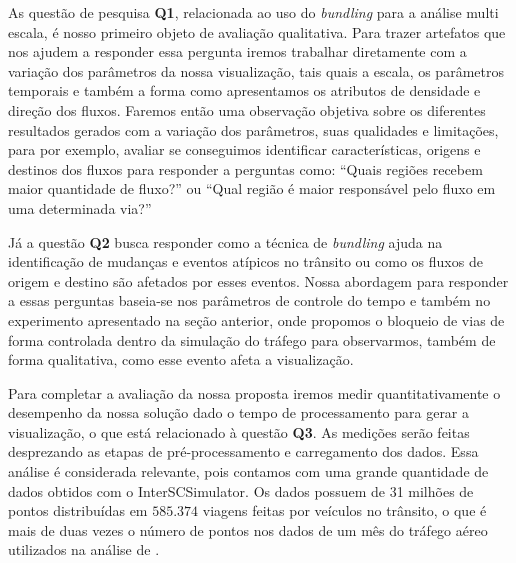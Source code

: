   As questão de pesquisa \textbf{Q1}, relacionada ao uso do \emph{bundling}
para a análise multi escala, é nosso primeiro objeto de avaliação qualitativa.
Para trazer artefatos que nos ajudem a responder essa pergunta iremos trabalhar
diretamente com a variação dos parâmetros da nossa visualização, tais quais a
escala, os parâmetros temporais e também a forma como apresentamos os atributos
de densidade e direção dos fluxos. Faremos então uma observação objetiva sobre
os diferentes resultados gerados com a variação dos parâmetros, suas qualidades
e limitações, para por exemplo, avaliar se conseguimos identificar
características, origens e destinos dos fluxos para responder a perguntas como:
``Quais regiões recebem maior quantidade de fluxo?'' ou ``Qual região é maior
responsável pelo fluxo em uma determinada via?''

  Já a questão \textbf{Q2} busca responder como a técnica de \emph{bundling}
ajuda na identificação de mudanças e eventos atípicos no trânsito ou como os
fluxos de origem e destino são afetados por esses eventos. Nossa abordagem para
responder a essas perguntas baseia-se nos parâmetros de controle do tempo e
também no experimento apresentado na seção anterior, onde propomos o bloqueio
de vias de forma controlada dentro da simulação do tráfego para observarmos,
também de forma qualitativa, como esse evento afeta a visualização.

  Para completar a avaliação da nossa proposta iremos medir quantitativamente o
desempenho da nossa solução dado o tempo de processamento para gerar a
visualização, o que está relacionado à questão \textbf{Q3}. As medições serão
feitas desprezando as etapas de pré-processamento e carregamento dos dados.
Essa análise é considerada relevante, pois contamos com uma grande quantidade
de dados obtidos com o InterSCSimulator. Os dados possuem de 31 milhões de
pontos distribuídas em $585.374$ viagens feitas por veículos no trânsito, o que
é mais de duas vezes o número de pontos nos dados de um mês do tráfego aéreo
utilizados na análise de \citet{Klein2013}.
